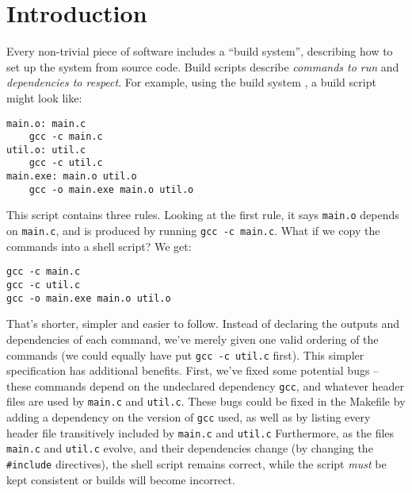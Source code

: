 \section{Introduction}
\label{sec:introduction}


Every non-trivial piece of software includes a ``build system'', describing how to set up the system from source code.
Build scripts \cite{build_systems_a_la_carte} describe \emph{commands to run} and \emph{dependencies to respect}. For example, using the \Make build system \cite{make}, a build script might look like:

\vspace{1mm}
\begin{small}
\begin{verbatim}
main.o: main.c
    gcc -c main.c
util.o: util.c
    gcc -c util.c
main.exe: main.o util.o
    gcc -o main.exe main.o util.o
\end{verbatim}
\end{small}
\vspace{1mm}

This script contains three rules. Looking at the first rule, it says \texttt{main.o} depends on \texttt{main.c}, and is produced by running \texttt{gcc -c main.c}. What if we copy the commands into a shell script? We get:

\vspace{1mm}
\begin{small}
\begin{verbatim}
gcc -c main.c
gcc -c util.c
gcc -o main.exe main.o util.o
\end{verbatim}
\end{small}
\vspace{1mm}

That's shorter, simpler and easier to follow. Instead of declaring the outputs and dependencies of each command, we've merely given one valid ordering of the commands (we could equally have put \texttt{gcc -c util.c} first). This simpler specification has additional benefits. First, we've fixed some potential bugs -- these commands depend on the undeclared dependency \texttt{gcc}, and whatever header files are used by \texttt{main.c} and \texttt{util.c}.  These bugs could be fixed in the Makefile by adding a dependency on the version of \texttt{gcc} used, as well as by listing every header file transitively included by \texttt{main.c} and \texttt{util.c}
Furthermore, as the files \texttt{main.c} and \texttt{util.c} evolve, and their dependencies change (by changing the \texttt{\#include} directives), the shell script remains correct, while the \Make script \emph{must} be kept consistent or builds will become incorrect.

